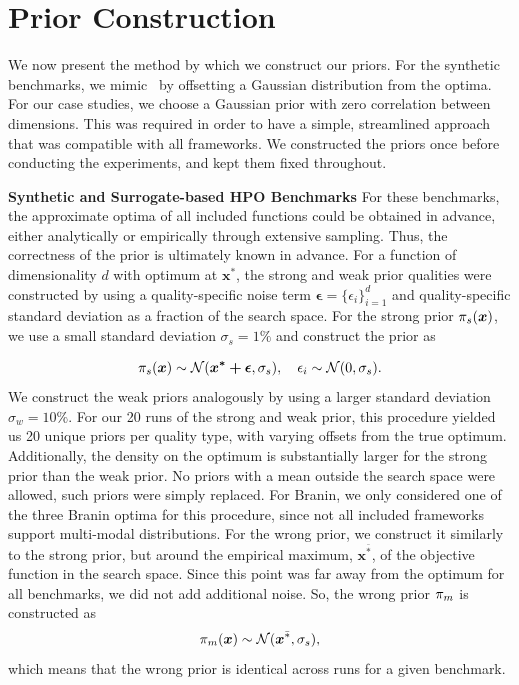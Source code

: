 \section{Prior Construction} \label{sec:priors}
We now present the method by which we construct our priors. For the synthetic benchmarks, we mimic~\citep{souza2021bayesian} by offsetting a Gaussian distribution from the optima. For our case studies, we choose a Gaussian prior with zero correlation between dimensions. This was required in order to have a simple, streamlined approach that was compatible with all frameworks. We constructed the priors once before conducting the experiments, and kept them fixed throughout.

\textbf{Synthetic and Surrogate-based HPO Benchmarks}\quad
For these benchmarks, the approximate optima of all included functions could be obtained in advance, either analytically or empirically through extensive sampling. Thus, the correctness of the prior is ultimately known in advance. For a function of dimensionality $d$ with optimum at ${\bm{x^*}}$, the strong and weak prior qualities were constructed by using a quality-specific noise term $\bm{\epsilon} = \{\epsilon_i\}_{i=1}^d$ and quality-specific standard deviation as a fraction of the search space. For the strong prior ${\pi}_s(\bm{x})$, we use a small standard deviation $\sigma_s = 1\%$ and construct the prior as

\begin{equation}
    {\pi}_s(\bm{x}) \sim \mathcal{N}(\bm{x^*+\epsilon}, \sigma_s), \quad \epsilon_i \sim\mathcal{N}(0, \sigma_s).
\end{equation}
We construct the weak priors analogously by using a larger standard deviation $\sigma_w = 10\%$. For our 20 runs of the strong and weak prior, this procedure yielded us 20 unique priors per quality type, with varying offsets from the true optimum. Additionally, the density on the optimum is substantially larger for the strong prior than the weak prior. No priors with a mean outside the search space were allowed, such priors were simply replaced. For Branin, we only considered one of the three Branin optima for this procedure, since not all included frameworks support multi-modal distributions. For the wrong prior, we construct it similarly to the strong prior, but around the empirical maximum, $\bm{x}^{\bar{*}}$, of the objective function in the search space. Since this point was far away from the optimum for all benchmarks, we did not add additional noise. So, the wrong prior ${\pi}_m$ is constructed as
\begin{equation}
    {\pi}_m(\bm{x}) \sim \mathcal{N}(\bm{x}^{\bar{*}}, \sigma_s),
\end{equation}
which means that the wrong prior is identical across runs for a given benchmark.

